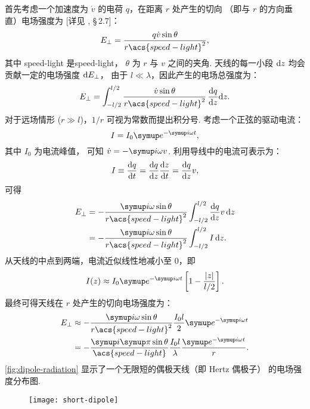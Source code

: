 首先考虑一个加速度为 $\dot{v}$ 的电荷 $q$，在距离 $r$ 处产生的切向
（即与 $r$ 的方向垂直）电场强度为 [详见 , \S\,2.7]：
\begin{equation}
  \label{eq:q-efield}
  E_{\bot} = \frac{q \dot{v} \sin\theta}{r \acs{speed-light}^2} ,
\end{equation}
其中
\acs{speed-light} 是\acl{speed-light}，
$\theta$ 为 $r$ 与 $v$ 之间的夹角.
天线的每一小段 $\mathrm{d}z$ 均会贡献一定的电场强度 $\mathrm{d}E_{\bot}$，
由于 $l \ll \lambda$，因此产生的电场总强度为：
\begin{equation}
  \label{eq:dipole-efield1}
  E_{\bot} = \int_{-l/2}^{l/2}
    \frac{\dot{v} \sin\theta}{r \acs{speed-light}^2} \,\diff{q}{z}\D{z} .
\end{equation}
对于远场情形 ($r \gg l$)，$1/r$ 可视为常数而提出积分号.
考虑一个正弦的驱动电流：
\begin{equation}
  \label{eq:dipole-current}
  I = I_0 \Ce^{-\Ci \omega t} ,
\end{equation}
其中 $I_0$ 为电流峰值，
可知 $\dot{v} = -\Ci \omega v$.
利用导线中的电流可表示为：
\begin{equation}
  \label{eq:wire-current}
  I \equiv \frac{\mathrm{d}q}{\mathrm{d}t} = \frac{\mathrm{d}q}{\mathrm{d}z} \frac{\mathrm{d}z}{\mathrm{d}t} = \frac{\mathrm{d}q}{\mathrm{d}z} v ,
\end{equation}
可得
\begin{align}
  \label{eq:dipole-efield2}
  E_{\bot}
    & = -\frac{\Ci\omega \sin\theta}{r \acs{speed-light}^2}
      \int_{-l/2}^{l/2} \diff{q}{z} v \,\D{z} \\
    & = -\frac{\Ci\omega \sin\theta}{r \acs{speed-light}^2}
      \int_{-l/2}^{l/2} I\,\D{z} .
\end{align}
从天线的中点到两端，电流近似线性地减小至 0，即
\begin{equation}
  \label{eq:dipole-current-dist}
  I(z) \approx I_0 \Ce^{-\Ci\omega t}
    \left[ 1 - \frac{|z|}{l/2} \right] .
\end{equation}
最终可得天线在 $r$ 处产生的切向电场强度为：
\begin{align}
  \label{eq:dipole-efield}
  E_{\bot}
    & \approx -\frac{\Ci\omega \sin\theta}{r \acs{speed-light}^2}
      \frac{I_0 l}{2} \Ce^{-\Ci\omega t} \\
    & = -\frac{\Ci\Cpi \sin\theta}{\acs{speed-light}}
      \frac{I_0 l}{\lambda} \frac{\Ce^{-\Ci\omega t}}{r} .
\end{align}
\autoref{fig:dipole-radiation} 显示了一个无限短的偶极天线（即 Hertz 偶极子）
的电场强度分布图.

\begin{figure}[htp]
  \centering
  \texttt{[image: short-dipole]}
  \label{fig:short-dipole}
\end{figure}

